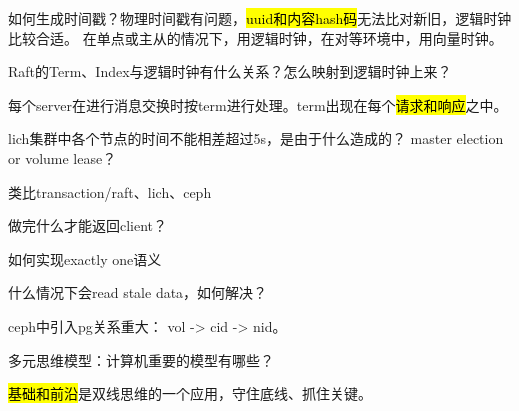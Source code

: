 如何生成时间戳？物理时间戳有问题，\hl{uuid和内容hash码}无法比对新旧，逻辑时钟比较合适。
在单点或主从的情况下，用逻辑时钟，在对等环境中，用向量时钟。

Raft的Term、Index与逻辑时钟有什么关系？怎么映射到逻辑时钟上来？

每个server在进行消息交换时按term进行处理。term出现在每个\hl{请求和响应}之中。

lich集群中各个节点的时间不能相差超过5s，是由于什么造成的？
master election or volume lease？

类比transaction/raft、lich、ceph
\begin{enumbox}
\item 做完什么才能返回client？
\item 如何实现exactly one语义
\item 什么情况下会read stale data，如何解决？
\end{enumbox}

ceph中引入pg关系重大： vol -> cid -> nid。

\hrulefill

多元思维模型：计算机重要的模型有哪些？

\hl{基础和前沿}是双线思维的一个应用，守住底线、抓住关键。
